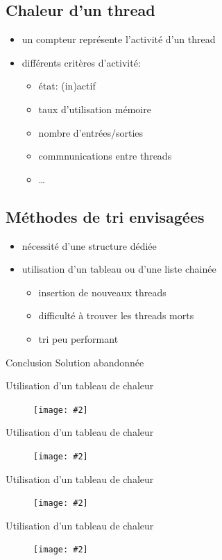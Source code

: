 \documentclass[mathserif]{beamer}
\newcommand{\myfig}[2] {
  \begin{figure}[!h]
    \centering
    \texttt{[image: \#2]}
  \end{figure}
}
\newcommand{\bframe}{\begin{frame}{\secname}{\subsecname}}
\begin{document}
    \subsection{Chaleur d'un thread}
      \bframe
        \begin{itemize}
          \item un compteur représente l'activité d'un thread
          \item différents critères d'activité:
            \begin{itemize}
              \item état: (in)actif
              \item taux d'utilisation mémoire
              \item nombre d'entrées/sorties
              \item commnunications entre threads
              \item \ldots
            \end{itemize}
        \end{itemize}
      \end{frame}

    \subsection{Méthodes de tri envisagées}
      \bframe
        \begin{itemize}
          \item nécessité d'une structure dédiée
          \item utilisation d'un tableau ou d'une liste chainée
          \begin{itemize}
            \item insertion de nouveaux threads
            \item difficulté à trouver les threads morts
            \item tri peu performant
          \end{itemize}
        \end{itemize}
         {
          \begin{alertblock}{Conclusion}
            Solution abandonnée
          \end{alertblock}
        }
      \end{frame}

      \bframe
          Utilisation d'un tableau de chaleur
          \myfig{0.9}{img/screen1.png}
      \end{frame}
      \bframe
          Utilisation d'un tableau de chaleur
          \myfig{0.9}{img/screen2.png}
      \end{frame}
      \bframe
          Utilisation d'un tableau de chaleur
          \myfig{0.9}{img/screen3.png}
      \end{frame}
      \bframe
          Utilisation d'un tableau de chaleur
          \myfig{0.9}{img/screen4.png}
      \end{frame}
\end{document}
